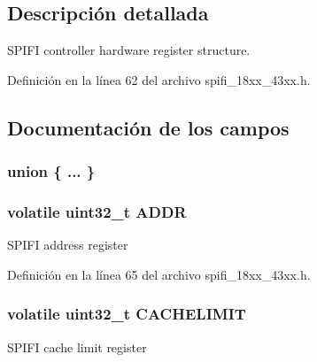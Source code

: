 \subsection{Descripción detallada}
S\+P\+I\+FI controller hardware register structure. 

Definición en la línea 62 del archivo spifi\+\_\+18xx\+\_\+43xx.\+h.



\subsection{Documentación de los campos}
\subsubsection[{\texorpdfstring{"@62}{@62}}]{\setlength{\rightskip}{0pt plus 5cm}union \{ ... \} }\hypertarget{struct_l_p_c___s_p_i_f_i___c_h_i_p_h_w_a92ae8fbbbceea43e720232f41e355506}{}\label{struct_l_p_c___s_p_i_f_i___c_h_i_p_h_w_a92ae8fbbbceea43e720232f41e355506}
\subsubsection[{\texorpdfstring{A\+D\+DR}{ADDR}}]{\setlength{\rightskip}{0pt plus 5cm}volatile uint32\+\_\+t A\+D\+DR}\hypertarget{struct_l_p_c___s_p_i_f_i___c_h_i_p_h_w_a01cf153f44f32eb541425633d6c3d3e4}{}\label{struct_l_p_c___s_p_i_f_i___c_h_i_p_h_w_a01cf153f44f32eb541425633d6c3d3e4}
S\+P\+I\+FI address register 

Definición en la línea 65 del archivo spifi\+\_\+18xx\+\_\+43xx.\+h.

\subsubsection[{\texorpdfstring{C\+A\+C\+H\+E\+L\+I\+M\+IT}{CACHELIMIT}}]{\setlength{\rightskip}{0pt plus 5cm}volatile uint32\+\_\+t C\+A\+C\+H\+E\+L\+I\+M\+IT}\hypertarget{struct_l_p_c___s_p_i_f_i___c_h_i_p_h_w_a74f7289f74c9a4529929e9ccbf0197d0}{}\label{struct_l_p_c___s_p_i_f_i___c_h_i_p_h_w_a74f7289f74c9a4529929e9ccbf0197d0}
S\+P\+I\+FI cache limit register 

